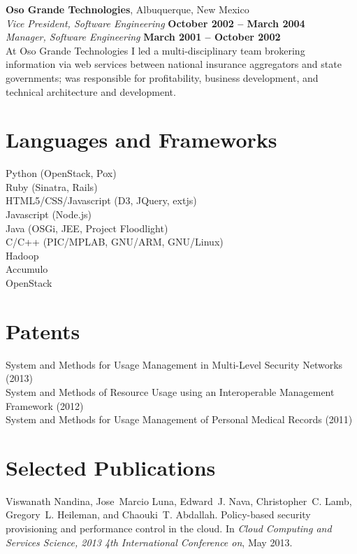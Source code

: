 \documentclass[margin,line]{resume}
\begin{document}
\begin{resume}
{\bf Oso Grande Technologies}, Albuquerque, New Mexico \vspace{2mm} \\
{\sl Vice President, Software Engineering} \hfill \textbf{October 2002 -- March 2004} \\\vspace{1mm}%
{\sl Manager, Software Engineering} \hfill \textbf{March 2001 -- October 2002} \\
At Oso Grande Technologies I led a multi-disciplinary team brokering information via web services between national insurance aggregators and state governments; was responsible for profitability, business development, and technical architecture and development.

\newpage

\section{\mysidestyle Languages and Frameworks}
Python (OpenStack, Pox) \\
Ruby (Sinatra, Rails) \\
HTML5/CSS/Javascript (D3, JQuery, extjs) \\
Javascript (Node.js) \\
Java (OSGi, JEE, Project Floodlight) \\
C/C++ (PIC/MPLAB, GNU/ARM, GNU/Linux) \\
Hadoop \\
Accumulo \\
OpenStack

\section{\mysidestyle Patents}
{\small System and Methods for Usage Management in Multi-Level Security Networks (2013)} \\
{\small System and Methods of Resource Usage using an Interoperable Management Framework (2012)} \\
{\small System and Methods for Usage Management of Personal Medical Records (2011)}

\section{\mysidestyle Selected Publications}
Viswanath Nandina, Jose~Marcio Luna, Edward~J. Nava, Christopher~C. Lamb,
  Gregory~L. Heileman, and Chaouki~T. Abdallah.
\newblock Policy-based security provisioning and performance control in the
  cloud.
\newblock In {\em Cloud Computing and Services Science, 2013 4th International
  Conference on}, May 2013.
  

\end{resume}
\end{document}
